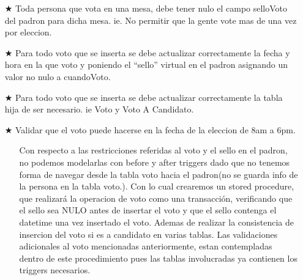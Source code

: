 \vspace{1.2cm}
\begin{itemize}
		\item[$\bigstar$] Toda persona que vota en una mesa, debe tener nulo el campo selloVoto del padron para dicha mesa. ie. No permitir que la gente vote mas de una vez por eleccion.
		\item[$\bigstar$] Para todo voto que se inserta se debe actualizar correctamente la fecha y hora en la que voto y poniendo el “sello” virtual en el padron asignando un valor no nulo a cuandoVoto.
		\item[$\bigstar$] Para todo voto que se inserta se debe actualizar correctamente la tabla hija de ser necesario. ie Voto y Voto A Candidato.
		\item[$\bigstar$] Validar que el voto puede hacerse en la fecha de la eleccion de 8am a 6pm.
		\begin{itemize}
			\item[\Checkmark] Con respecto a las restricciones referidas al voto y el sello en el padron, no podemos modelarlas con before y after triggers dado que no tenemos forma de navegar desde la tabla voto hacia el padron(no se guarda info de la persona en la tabla voto.). Con lo cual crearemos un stored procedure, que realizará la operacion de voto como una transacción, verificando que el sello sea NULO antes de insertar el voto y que el sello contenga el datetime una vez insertado el voto. Ademas de realizar la consistencia de insercion del voto si es a candidato en varias tablas. Las validaciones adicionales al voto mencionadas anteriormente, estan contempladas dentro de este procedimiento pues las tablas involucradas ya contienen los triggers necesarios.
		\end{itemize}
\end{itemize}
\vspace{1.2cm}
